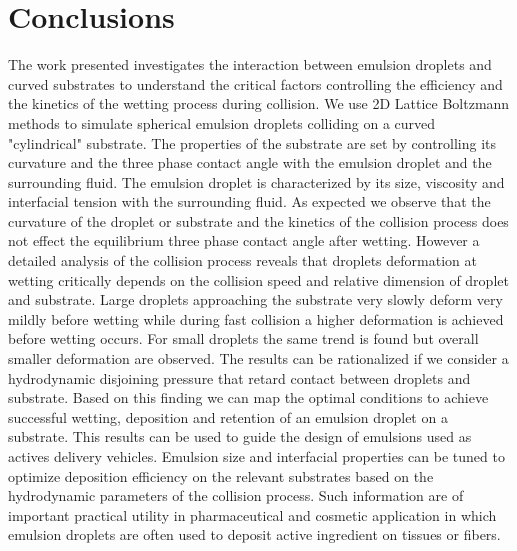 \documentclass{article}
\begin{document}
\section{Conclusions}
The work presented investigates the interaction between emulsion droplets and curved substrates to understand the critical factors controlling the efficiency and the kinetics of the wetting process during collision. We use 2D Lattice Boltzmann methods to simulate spherical emulsion droplets colliding on a curved "cylindrical" substrate. The properties of the substrate are set by controlling its curvature and the three phase contact angle with the emulsion droplet and the surrounding fluid. The emulsion droplet is characterized by its size, viscosity and interfacial tension with the surrounding fluid. As expected we observe that the curvature of the droplet or substrate and the kinetics of the collision process does not effect the equilibrium three phase contact angle after wetting. However a detailed analysis of the collision process reveals that droplets deformation at wetting critically depends on the collision speed and relative dimension of droplet and substrate. Large droplets approaching the substrate very slowly deform very mildly before wetting while during fast collision a higher deformation is achieved before wetting occurs. For small droplets the same trend is found but overall smaller deformation are observed. The results can be rationalized if we consider a hydrodynamic disjoining pressure that retard contact between droplets and substrate. Based on this finding we can map the optimal conditions to achieve successful wetting, deposition and retention of an emulsion droplet on a substrate. This results can be used to guide the design of emulsions used as actives delivery vehicles. Emulsion size and interfacial properties can be tuned to optimize deposition efficiency on the relevant substrates based on the hydrodynamic parameters of the collision process. Such information are of important practical utility in pharmaceutical and cosmetic application in which emulsion droplets are often used to deposit active ingredient on tissues or fibers.  


\end{document}
